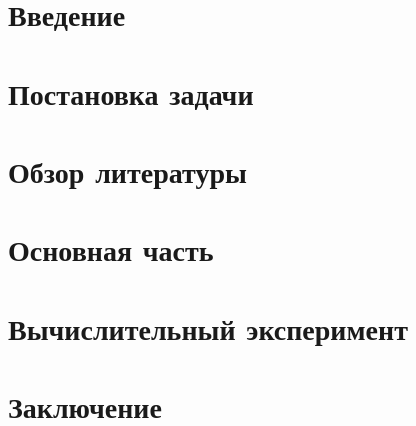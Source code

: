 




\newpage
\tableofcontents
\pagebreak



\newpage
\section{Введение}


\newpage
\section{Постановка задачи}


\newpage
\section{Обзор литературы}


\newpage
\section{Основная часть}


\newpage
\section{Вычислительный эксперимент}


\newpage
\section{Заключение}



\newpage





